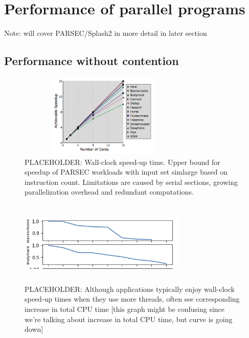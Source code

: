 \section{Performance of parallel programs}

Note: will cover PARSEC/Splash2 in more detail in later section \cite{bienia2011benchmarking} \cite{bienia2008parsec} \cite{bienia2012characteristics}

\subsection{Performance without contention}

\begin{figure}
\centering
  \includegraphics[width=8cm,height=4cm]{fig/speed-up.png}
  \caption{PLACEHOLDER: Wall-clock speed-up time. Upper bound for speedup of PARSEC workloads with input set simlarge based on instruction count. Limitations are caused by serial sections, growing parallelization overhead and redundant computations.}
  \label{fig:speed-up}
\end{figure}

\begin{figure}
\centering
  \includegraphics[width=8cm,height=4cm]{fig/slow-down.png}
  \caption{PLACEHOLDER: Although applications typically enjoy wall-clock speed-up times when they use more threads, often see corresponding increase in total CPU time [this graph might be confusing since we're talking about increase in total CPU time, but curve is going down]}
  \label{fig:slow-down}
\end{figure}

